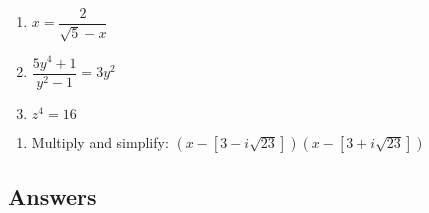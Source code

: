 \documentclass[10pt]{article}
\begin{document}
\begin{multicols}{3}
\begin{enumerate}
\setcounter{enumi}{\value{HW}}

\item  $x =\dfrac{2}{\sqrt{5} - x}$
\item  $\dfrac{5y^4 + 1}{y^2-1} = 3y^2$
\item  $z^{4} = 16$  \label{solvecomplexlast}

\setcounter{HW}{\value{enumi}}
\end{enumerate}
\end{multicols}


\begin{enumerate}
\setcounter{enumi}{\value{HW}}

\item  Multiply and simplify:  $\left(x - [3 - i\sqrt{23}]\right)\left(x - [3+i\sqrt{23}]\right)$

\end{enumerate}


\newpage

\subsection{Answers}
\end{document}
